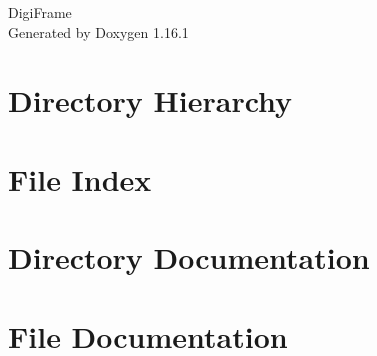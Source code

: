 \documentclass[twoside]{book}
\newcommand{\+}{\discretionary{\mbox{\scriptsize$\hookleftarrow$}}{}{}}
\newcommand{\clearemptydoublepage}{%
    \newpage{\pagestyle{empty}\cleardoublepage}%
  }
\begin{document}
  \raggedbottom
    \hypersetup{pageanchor=false,
                bookmarksnumbered=true,
                pdfencoding=unicode
               }
  \begin{titlepage}
  \vspace*{7cm}
  \begin{center}%
  {\Large Digi\+Frame}\\
  \vspace*{1cm}
  {\large Generated by Doxygen 1.16.1}\\
  \end{center}
  \end{titlepage}
  \clearemptydoublepage
  \tableofcontents
  \clearemptydoublepage
  \hypersetup{pageanchor=true}

\chapter{Directory Hierarchy}

\chapter{File Index}

\chapter{Directory Documentation}




\chapter{File Documentation}











  \backmatter
  \newpage
  \clearemptydoublepage
  \printindex
\end{document}
